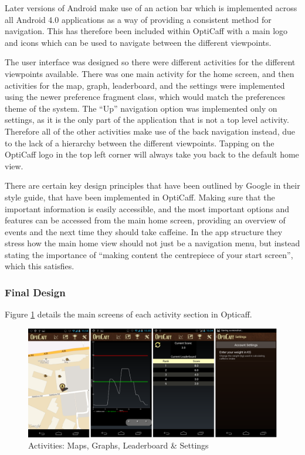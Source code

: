 Later versions of Android make use of an action bar which is implemented across all Android 4.0 applications as a way of providing a consistent method for navigation. This has therefore been included within OptiCaff with a main logo and icons which can be used to navigate between the different viewpoints.
                   
The user interface was designed so there were different activities for the different viewpoints available. There was one main activity for the home screen, and then activities for the map, graph, leaderboard, and the settings were implemented using the newer preference fragment class, which would match the preferences theme of the system. The ``Up” navigation option was implemented only on settings, as it is the only part of the application that is not a top level activity. Therefore all of the other activities make use of the back navigation instead, due to the lack of a hierarchy between the different viewpoints. Tapping on the OptiCaff logo in the top left corner will always take you back to the default home view.
                   
There are certain key design principles that have been outlined by Google in their style guide, that have been implemented in OptiCaff. Making sure that the important information is easily accessible, and the most important options and features can be accessed from the main home screen, providing an overview of events and the next time they should take caffeine. In the app structure they stress how the main home view should not just be a navigation menu, but instead stating the importance of ``making content the centrepiece of your start screen”, which this satisfies.       
                   
\subsubsection{Final Design}
                   
Figure \ref{fig:Activities} details the main screens of each activity section in Opticaff.
                   
\begin{figure}[ht]
\begin{center}
\includegraphics[scale=0.23]{images/app.png}
\caption{Activities: Maps, Graphs, Leaderboard \& Settings} 
\label{fig:Activities}
\end{center}
\end{figure}

